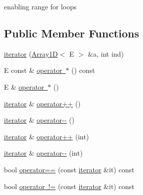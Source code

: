 enabling range for loops \subsection*{Public Member Functions}
\begin{DoxyCompactItemize}
\item 
\mbox{\hyperlink{classbridges_1_1datastructure_1_1_array1_d_1_1iterator_a5bfe7e8948825c5814a95b05551496e4}{iterator}} (\mbox{\hyperlink{classbridges_1_1datastructure_1_1_array1_d}{Array1D}}$<$ E $>$ \&a, int ind)
\item 
E const  \& \mbox{\hyperlink{classbridges_1_1datastructure_1_1_array1_d_1_1iterator_a8adfaba0d7cb46b0962ef607195aee73}{operator $\ast$}} () const
\item 
E \& \mbox{\hyperlink{classbridges_1_1datastructure_1_1_array1_d_1_1iterator_a7ec9a1a0e2d005f1e188a1507041b4ce}{operator $\ast$}} ()
\item 
\mbox{\hyperlink{classbridges_1_1datastructure_1_1_array1_d_1_1iterator}{iterator}} \& \mbox{\hyperlink{classbridges_1_1datastructure_1_1_array1_d_1_1iterator_a1d8394de4e75cf1dffd1465beba2f85a}{operator++}} ()
\item 
\mbox{\hyperlink{classbridges_1_1datastructure_1_1_array1_d_1_1iterator}{iterator}} \& \mbox{\hyperlink{classbridges_1_1datastructure_1_1_array1_d_1_1iterator_ae63ca794e437c96e713a5c51844766f9}{operator-\/-\/}} ()
\item 
\mbox{\hyperlink{classbridges_1_1datastructure_1_1_array1_d_1_1iterator}{iterator}} \& \mbox{\hyperlink{classbridges_1_1datastructure_1_1_array1_d_1_1iterator_a113e2d57db9888db18681558b6ddd4c2}{operator++}} (int)
\item 
\mbox{\hyperlink{classbridges_1_1datastructure_1_1_array1_d_1_1iterator}{iterator}} \& \mbox{\hyperlink{classbridges_1_1datastructure_1_1_array1_d_1_1iterator_a600898496da4155d0c58399cf9d1b4cf}{operator-\/-\/}} (int)
\item 
bool \mbox{\hyperlink{classbridges_1_1datastructure_1_1_array1_d_1_1iterator_a59e1cdad748d872e7d07a26009a5a596}{operator==}} (const \mbox{\hyperlink{classbridges_1_1datastructure_1_1_array1_d_1_1iterator}{iterator}} \&it) const
\item 
bool \mbox{\hyperlink{classbridges_1_1datastructure_1_1_array1_d_1_1iterator_a62c96bb924e252c3cf06cd1a5de923dc}{operator !=}} (const \mbox{\hyperlink{classbridges_1_1datastructure_1_1_array1_d_1_1iterator}{iterator}} \&it) const
\end{DoxyCompactItemize}


